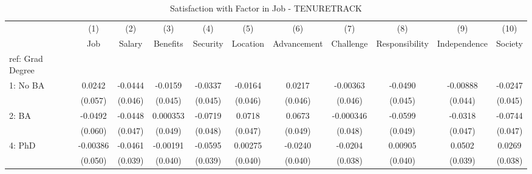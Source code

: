 \begin{table}[htbp]\centering
\def\sym#1{\ifmmode^{#1}\else\(^{#1}\)\fi}
\caption{Satisfaction with Factor in Job - TENURETRACK \label{tab1}}
\begin{tabular}{l*{10}{c}}
\hline\hline
  &\multicolumn{1}{c}{(1)}&\multicolumn{1}{c}{(2)}&\multicolumn{1}{c}{(3)}&\multicolumn{1}{c}{(4)}&\multicolumn{1}{c}{(5)}&\multicolumn{1}{c}{(6)}&\multicolumn{1}{c}{(7)}&\multicolumn{1}{c}{(8)}&\multicolumn{1}{c}{(9)}&\multicolumn{1}{c}{(10)}\\
  &\multicolumn{1}{c}{Job}&\multicolumn{1}{c}{Salary}&\multicolumn{1}{c}{Benefits}&\multicolumn{1}{c}{Security}&\multicolumn{1}{c}{Location}&\multicolumn{1}{c}{Advancement}&\multicolumn{1}{c}{Challenge}&\multicolumn{1}{c}{Responsibility}&\multicolumn{1}{c}{Independence}&\multicolumn{1}{c}{Society}\\
\hline
ref: Grad Degree&                     &                     &                     &                     &                     &                     &                     &                     &                     &                     \\
[1em]
1: No BA&      0.0242         &     -0.0444         &     -0.0159         &     -0.0337         &     -0.0164         &      0.0217         &    -0.00363         &     -0.0490         &    -0.00888         &     -0.0247         \\
  &     (0.057)         &     (0.046)         &     (0.045)         &     (0.045)         &     (0.046)         &     (0.046)         &     (0.046)         &     (0.045)         &     (0.044)         &     (0.045)         \\
[1em]
2: BA&     -0.0492         &     -0.0448         &    0.000353         &     -0.0719         &      0.0718         &      0.0673         &   -0.000346         &     -0.0599         &     -0.0318         &     -0.0744         \\
  &     (0.060)         &     (0.047)         &     (0.049)         &     (0.048)         &     (0.047)         &     (0.049)         &     (0.048)         &     (0.049)         &     (0.047)         &     (0.047)         \\
[1em]
4: PhD&    -0.00386         &     -0.0461         &    -0.00191         &     -0.0595         &     0.00275         &     -0.0240         &     -0.0204         &     0.00905         &      0.0502         &      0.0269         \\
  &     (0.050)         &     (0.039)         &     (0.040)         &     (0.039)         &     (0.040)         &     (0.040)         &     (0.038)         &     (0.040)         &     (0.039)         &     (0.038)         \\

\end{tabular}
\end{table}
